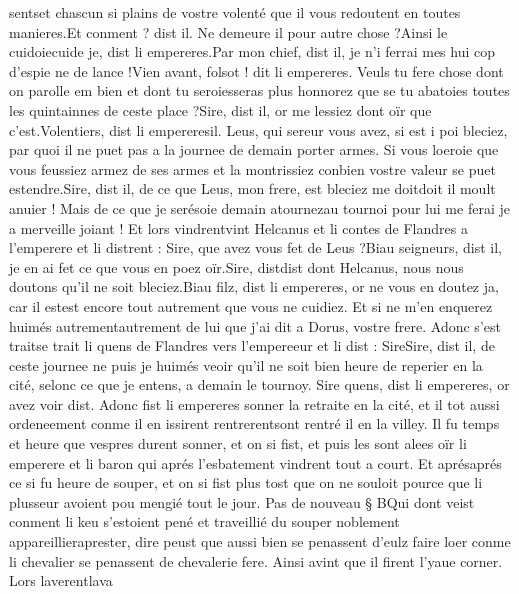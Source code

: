 \documentclass{article}
\begin{document}
\begin{pages}
      sentset chascun si plains  de vostre volenté que il vous redoutent 
      en toutes manieres.Et conment ? dist il. Ne demeure il pour autre chose ?Ainsi le cuidoiecuide je, dist 
      li empereres.Par mon chief, dist il, je n’i ferrai mes hui cop d’espie ne de lance !Vien avant, folsot ! 
      dit li empereres. Veuls tu fere chose dont on parolle em bien et dont tu 
      seroiesseras plus honnorez que se tu abatoies toutes les quintainnes de ceste 
      place ?Sire, dist il, or me lessiez dont oïr que c’est.Volentiers, dist 
      li empereresil.
      Leus, qui sereur vous avez, si est i poi bleciez, 
      par quoi il ne puet pas a la journee de demain porter armes. Si vous loeroie que vous feussiez armez de ses armes et la montrissiez 
      conbien vostre valeur se puet estendre.Sire, dist il, de ce que Leus, mon frere, est bleciez me 
      doitdoit il moult anuier !
      Mais de ce que je serésoie 
      demain atournezau tournoi pour lui me ferai je a merveille joiant !
   Et lors vindrentvint Helcanus et
   li contes de Flandres a 
   l’emperere et li distrent :
   Sire, que avez vous fet de Leus ?Biau seigneurs, dist il, 
      je en ai fet ce que vous en poez oïr.Sire, distdist dont 
      Helcanus, nous nous doutons qu’il ne soit bleciez.Biau filz, dist li empereres,
      or ne vous en doutez ja, car il 
      estest encore tout autrement que vous ne cuidiez. 
      Et si ne m’en enquerez huimés autrementautrement de lui que j’ai dit a 
      Dorus, vostre frere.
   Adonc s’est traitse trait 
   li quens de Flandres 
   vers l’empereeur et li dist :
   SireSire, dist il, de ceste journee 
      ne puis je huimés veoir qu’il ne soit 
      bien heure de reperier en la cité, selonc ce que je entens, a demain le tournoy. \pend
\pstart Sire quens, dist li empereres, 
   or avez voir dist. Adonc fist li empereres sonner la retraite en
   la cité, et il tot aussi ordeneement 
   conme il en issirent 
   rentrerentsont rentré il 
   en la villey. 
   Il fu temps et heure que vespres durent sonner, et on si fist, et puis les sont alees oïr 
   li emperere et li baron qui aprés l’esbatement vindrent tout a court. Et 
   aprésaprés ce si fu heure de souper, et on si fist plus tost que on ne souloit 
   pource que li plusseur avoient pou mengié tout le jour. \pend
\pstart Pas de nouveau § BQui dont veist conment li keu s’estoient pené 
   et traveillié du souper noblement 
   appareillieraprester, dire peust que aussi bien se penassent d’eulz faire loer
   conme li chevalier se penassent de chevalerie fere. Ainsi avint que il firent 
   l’yaue corner. Lors laverentlava 

\end{pages}
\end{document}
